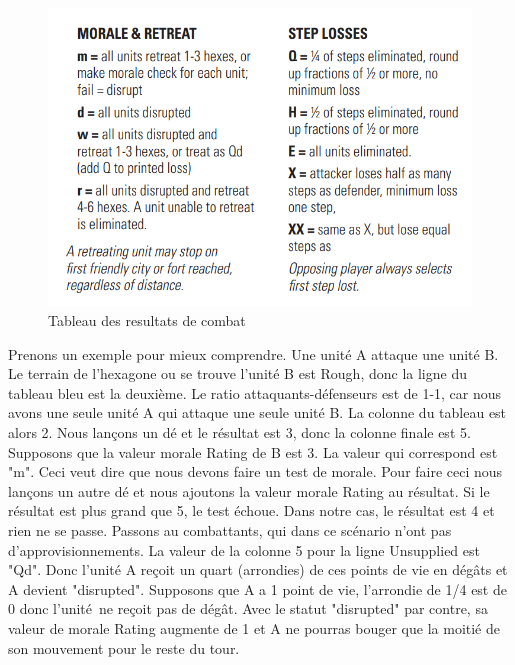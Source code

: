 \begin{figure}[H]
\centering
\includegraphics[scale=0.25]{data/morale_et_retraite.png}
\caption{Tableau des resultats de combat}
\end{figure}

Prenons un exemple pour mieux comprendre. Une unité A attaque une unité B. Le terrain de l'hexagone ou se trouve l'unité B est Rough, donc la ligne du tableau bleu est la deuxième.
Le ratio attaquants-défenseurs est de 1-1, car nous avons une seule unité A qui attaque une seule unité B. La colonne du tableau est alors 2.
Nous lançons un dé et le résultat est 3, donc la colonne finale est 5. Supposons que la valeur morale Rating de B est 3.
La valeur qui correspond est "m". Ceci veut dire que nous devons faire un test de morale.
Pour faire ceci nous lançons un autre dé et nous ajoutons la valeur morale Rating au résultat. Si le résultat est plus grand que 5, le test échoue.
Dans notre cas, le résultat est 4 et rien ne se passe. Passons au combattants, qui dans ce scénario
n'ont pas d'approvisionnements. La valeur de la colonne 5 pour la ligne Unsupplied est "Qd".
Donc l'unité A reçoit un quart (arrondies) de ces points de vie en dégâts et A devient "disrupted".
Supposons que A a 1 point de vie, l'arrondie de 1/4 est de 0 donc l'unité ne reçoit pas de dégât.
Avec le statut "disrupted" par contre, sa valeur de morale Rating augmente de 1 et A ne pourras bouger que la moitié de son mouvement pour le reste du tour.
